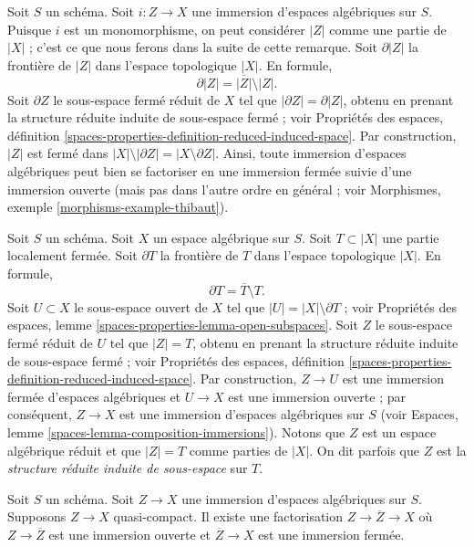 \begin{remark}
\label{remark-immersion}
Soit $S$ un schéma. Soit $i : Z \to X$ une immersion d'espaces
algébriques sur $S$. Puisque $i$ est un monomorphisme, on peut considérer $|Z|$ comme
une partie de $|X|$ ; c'est ce que nous ferons dans la suite de cette remarque.
Soit $\partial |Z|$ la frontière de $|Z|$ dans
l'espace topologique $|X|$. En formule,
$$
\partial |Z| = \overline{|Z|} \setminus |Z|.
$$
Soit $\partial Z$ le sous-espace fermé réduit de $X$ tel que
$|\partial Z| = \partial |Z|$,
obtenu en prenant la structure réduite induite de sous-espace fermé ; voir
Propriétés des espaces,
définition \ref{spaces-properties-definition-reduced-induced-space}.
Par construction, $|Z|$ est fermé dans
$|X| \setminus |\partial Z| = |X \setminus \partial Z|$.
Ainsi, toute immersion d'espaces algébriques peut bien se
factoriser en une immersion fermée suivie d'une immersion ouverte
(mais pas dans l'autre ordre en général ; voir
Morphismes, exemple \ref{morphisms-example-thibaut}).
\end{remark}

\begin{remark}
\label{remark-space-structure-locally-closed-subset}
Soit $S$ un schéma. Soit $X$ un espace algébrique sur $S$.
Soit $T \subset |X|$ une partie localement fermée.
Soit $\partial T$ la frontière de $T$ dans
l'espace topologique $|X|$. En formule,
$$
\partial T = \overline{T} \setminus T.
$$
Soit $U \subset X$ le sous-espace ouvert de $X$ tel que
$|U| = |X| \setminus \partial T$ ; voir
Propriétés des espaces, lemme \ref{spaces-properties-lemma-open-subspaces}.
Soit $Z$ le sous-espace fermé réduit de $U$ tel que
$|Z| = T$, obtenu en prenant la structure réduite induite
de sous-espace fermé ; voir
Propriétés des espaces,
définition \ref{spaces-properties-definition-reduced-induced-space}.
Par construction, $Z \to U$ est une immersion fermée d'espaces algébriques
et $U \to X$ est une immersion ouverte ; par conséquent,
$Z \to X$ est une immersion d'espaces algébriques sur $S$ (voir
Espaces, lemme \ref{spaces-lemma-composition-immersions}).
Notons que $Z$ est un espace algébrique réduit et que
$|Z| = T$ comme parties de $|X|$. On dit parfois que
$Z$ est la {\it structure réduite induite de sous-espace} sur $T$.
\end{remark}

\begin{lemma}
\label{lemma-factor-the-other-way}
Soit $S$ un schéma. Soit $Z \to X$ une immersion d'espaces algébriques sur
$S$. Supposons $Z \to X$ quasi-compact.
Il existe une factorisation $Z \to \overline{Z} \to X$ où
$Z \to \overline{Z}$ est une immersion ouverte et $\overline{Z} \to X$
est une immersion fermée.
\end{lemma}

